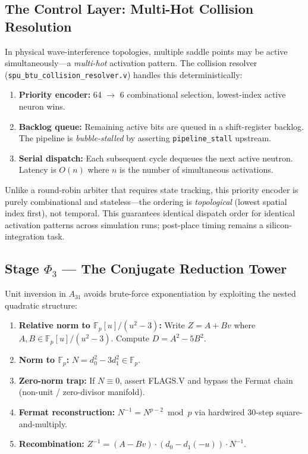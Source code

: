 \documentclass[conference]{IEEEtran}
\begin{document}
\subsection{The Control Layer: Multi-Hot Collision Resolution}

In physical wave-interference topologies, multiple saddle points may be
active simultaneously---a \emph{multi-hot} activation pattern. The
collision resolver (\texttt{spu\_btu\_collision\_resolver.v}) handles this
deterministically:

\begin{enumerate}
\item \textbf{Priority encoder:} 64 $\rightarrow$ 6 combinational
selection, lowest-index active neuron wins.
\item \textbf{Backlog queue:} Remaining active bits are queued in a
shift-register backlog. The pipeline is \emph{bubble-stalled} by asserting
\texttt{pipeline\_stall} upstream.
\item \textbf{Serial dispatch:} Each subsequent cycle dequeues the next
active neutron. Latency is $O(n)$ where $n$ is the number of simultaneous
activations.
\end{enumerate}

Unlike a round-robin arbiter that requires state tracking, this priority
encoder is purely combinational and stateless---the ordering is
\emph{topological} (lowest spatial index first), not temporal. This
guarantees identical dispatch order for identical activation patterns
across simulation runs; post-place timing remains a silicon-integration task.

\subsection{Stage $\Phi_3$ — The Conjugate Reduction Tower}
\label{sec:tower}

Unit inversion in $A_{31}$ avoids brute-force exponentiation by exploiting the
nested quadratic structure:
\begin{enumerate}
\item \textbf{Relative norm to $\mathbb{F}_p[u]/(u^2-3)$:} Write $Z = A +
Bv$ where $A, B \in \mathbb{F}_p[u]/(u^2-3)$. Compute $D = A^2 -
5B^2$.
\item \textbf{Norm to $\mathbb{F}_p$:} $N = d_0^2 - 3d_1^2 \in \mathbb{F}_p$.
\item \textbf{Zero-norm trap:} If $N \equiv 0$, assert FLAGS.V and bypass
the Fermat chain (non-unit / zero-divisor manifold).
\item \textbf{Fermat reconstruction:} $N^{-1} = N^{p-2} \bmod p$ via
hardwired 30-step square-and-multiply.
\item \textbf{Recombination:} $Z^{-1} = (A - Bv) \cdot (d_0 -
d_1(-u)) \cdot N^{-1}$.
\end{enumerate}
\end{document}
